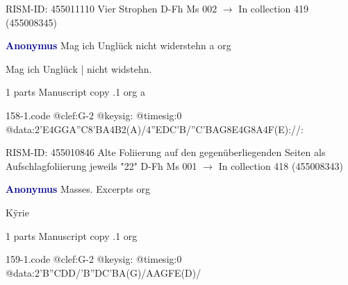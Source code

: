 \documentclass[twocolumn]{book}
\begin{document}
\newline RISM-ID: 455011110
\newline Vier Strophen
\newline D-Fh  Ms 002
\newline $\rightarrow$ In collection 419 (455008345)

\newline \par \vspace{7pt} \textcolor{darkblue}{\textbf{Anonymus  }}
\newline Mag ich Unglück nicht widerstehn  a  
\newline org
\newline \begin{itshape}[f.21v, at left:] Mag ich Unglück | nicht widstehn.\end{itshape} 
\newline \textcolor{darkblue}{}  1 parts  
\newline Manuscript copy
.1  org  a  
\begin{filecontents*}{158-1.code}
@clef:G-2
@keysig:
@timesig:0
@data:2'E4GGA''C{8'BA}4B2(A)/4''EDC'B/''C'BAG8E4G8A4F(E)://:
\end{filecontents*}
\newline
%

\newline RISM-ID: 455010846
\newline Alte Foliierung auf den gegenüberliegenden Seiten als Aufschlagfoliierung jeweils "22"
\newline D-Fh  Ms 001
\newline $\rightarrow$ In collection 418 (455008343)

\newline \par \vspace{7pt} \textcolor{darkblue}{\textbf{Anonymus  }}
\newline Masses. Excerpts    
\newline org
\newline \begin{itshape}[f.18v, at left:] Kÿrie\end{itshape} 
\newline \textcolor{darkblue}{}  1 parts  
\newline Manuscript copy
.1  org  
\begin{filecontents*}{159-1.code}
@clef:G-2
@keysig:
@timesig:0
@data:2'B''CDD/'B''DC'BA(G)/AAGFE(D)/
\end{filecontents*}
\newline
%
\end{document}
